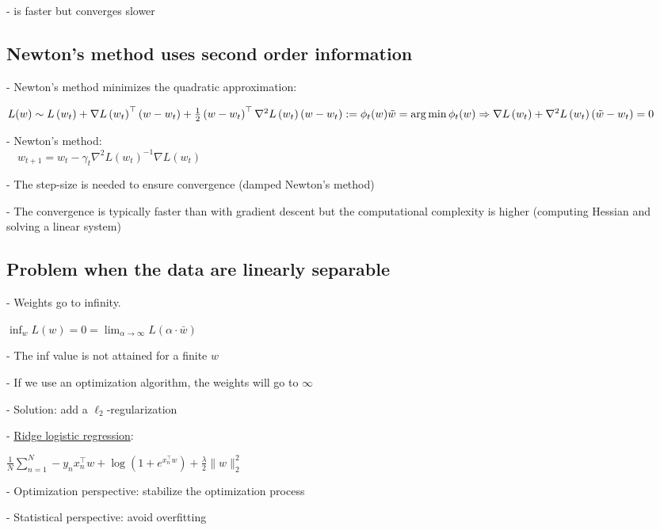 - is faster but converges slower

\subsection*{Newton's method uses second order information}
- Newton's method minimizes the quadratic approximation:

$
L(w) \sim L\left(w_{t}\right)+\nabla L\left(w_{t}\right)^{\top}\left(w-w_{t}\right)+\frac{1}{2}\left(w-w_{t}\right)^{\top} \nabla^{2} L\left(w_{t}\right)\left(w-w_{t}\right) :=\phi_{t}(w) \\
\tilde{w}=\arg \min \phi_{t}(w) \Rightarrow \\\nabla L\left(w_{t}\right)+\nabla^{2} L\left(w_{t}\right)\left(\tilde{w}-w_{t}\right)=0
$

- Newton's method: \\ $\quad w_{t+1}=w_{t}-\gamma_{t} \nabla^{2} L\left(w_{t}\right)^{-1} \nabla L\left(w_{t}\right)$

- The step-size is needed to ensure convergence (damped Newton's method)

- The convergence is typically faster than with gradient descent but the computational complexity is higher (computing Hessian and solving a linear system)

\subsection*{Problem when the data are linearly separable}

- Weights go to infinity.

$
\inf _{w} L(w)=0=\lim _{\alpha \rightarrow \infty} L(\alpha \cdot \bar{w})
$

- The inf value is not attained for a finite $w$

- If we use an optimization algorithm, the weights will go to $\infty$

- Solution: add a $\ell_{2}$-regularization

- \underline{Ridge logistic regression}:

$\frac{1}{N} \sum_{n=1}^{N}-y_{n} x_{n}^{\top} w+\log \left(1+e^{x_{n}^{\top} w}\right)+\frac{\lambda}{2}\|w\|_{2}^{2}$

- Optimization perspective: stabilize the optimization process

- Statistical perspective: avoid overfitting
